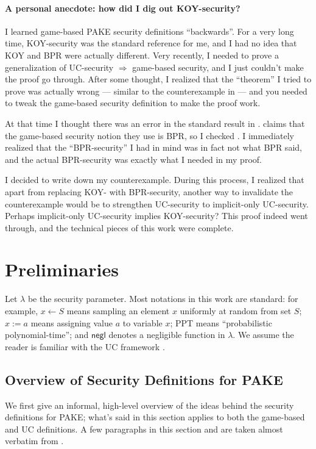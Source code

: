 \documentclass{article}
\newcommand{\negl}{\mathsf{negl}}
\begin{document}
\paragraph{A personal anecdote: how did I dig out KOY-security?}
I learned game-based PAKE security definitions ``backwards''. For a very long time, KOY-security was the standard reference for me, and I had no idea that KOY and BPR were actually different. Very recently, I needed to prove a generalization of UC-security $\Rightarrow$ game-based security, and I just couldn't make the proof go through. After some thought, I realized that the ``theorem'' I tried to prove was actually wrong --- similar to the counterexample in  --- and you needed to tweak the game-based security definition to make the proof work.

At that time I thought there was an error in the standard result in \cite{EC:CHKLM05}. \cite{EC:CHKLM05} claims that the game-based security notion they use is BPR, so I checked \cite{EC:BelPoiRog00}. I immediately realized that the ``BPR-security'' I had in mind was in fact not what BPR said, and the actual BPR-security was exactly what I needed in my proof.

I decided to write down my counterexample. During this process, I realized that apart from replacing KOY- with BPR-security, another way to invalidate the counterexample would be to strengthen UC-security to implicit-only UC-security. Perhaps implicit-only UC-security implies KOY-security? This proof indeed went through, and the technical pieces of this work were complete.

\section{Preliminaries}
\label{sec:prelims}
Let $\lambda$ be the security parameter. Most notations in this work are standard: for example, $x \gets S$ means sampling an element $x$ uniformly at random from set $S$; $x := a$ means assigning value $a$ to variable $x$; PPT means ``probabilistic polynomial-time''; and $\negl$ denotes a negligible function in $\lambda$. We assume the reader is familiar with the UC framework \cite{FOCS:Canetti01}.
\subsection{Overview of Security Definitions for PAKE}
\label{sec:principles}
We first give an informal, high-level overview of the ideas behind the security definitions for PAKE; what's said in this section applies to both the game-based and UC definitions. A few paragraphs in this section and  are taken almost verbatim from \cite{EPRINT:Xu25}.
\end{document}
